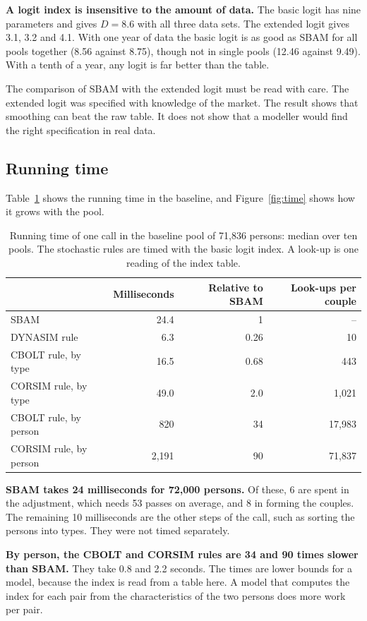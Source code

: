 \documentclass[12pt,a4paper]{article}
\begin{document}
\textbf{A logit index is insensitive to the amount of data.} The basic logit has nine parameters
and gives $D = 8.6$ with all three data sets. The extended logit gives 3.1, 3.2 and 4.1. With one
year of data the basic logit is as good as SBAM for all pools together (8.56 against 8.75),
though not in single pools (12.46 against 9.49). With a tenth of a year, any logit is far better
than the table.

The comparison of SBAM with the extended logit must be read with care. The extended logit was
specified with knowledge of the market. The result shows that smoothing can beat the raw table.
It does not show that a modeller would find the right specification in real data.

\subsection{Running time}

Table~\ref{tab:time} shows the running time in the baseline, and Figure~\ref{fig:time} shows how
it grows with the pool.

\begin{table}[H]
\centering
\caption{Running time of one call in the baseline pool of 71,836 persons: median over ten pools.
The stochastic rules are timed with the basic logit index. A look-up is one reading of the index
table.}
\label{tab:time}
\small
\begin{tabular}{@{}l rrr@{}}
\toprule
 & Milliseconds & Relative to SBAM & Look-ups per couple \\
\midrule
SBAM & 24.4 & 1 & -- \\
DYNASIM rule & 6.3 & 0.26 & 10 \\
CBOLT rule, by type & 16.5 & 0.68 & 443 \\
CORSIM rule, by type & 49.0 & 2.0 & 1,021 \\
CBOLT rule, by person & 820 & 34 & 17,983 \\
CORSIM rule, by person & 2,191 & 90 & 71,837 \\
\bottomrule
\end{tabular}
\end{table}

\textbf{SBAM takes 24 milliseconds for 72,000 persons.} Of these, 6 are spent in the adjustment,
which needs 53 passes on average, and 8 in forming the couples. The remaining 10 milliseconds
are the other steps of the call, such as sorting the persons into types. They were not timed
separately.

\textbf{By person, the CBOLT and CORSIM rules are 34 and 90 times slower than SBAM.} They take
0.8 and 2.2 seconds. The times are lower bounds for a model, because the index is read from a
table here. A model that computes the index for each pair from the characteristics of the two
persons does more work per pair.
\end{document}
